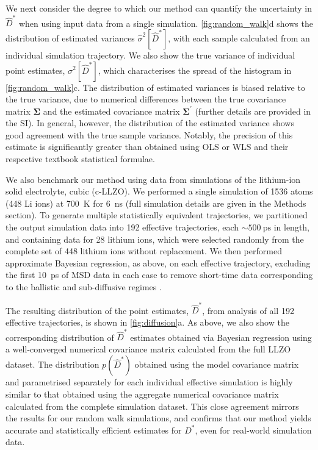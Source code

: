\documentclass[reprint,superscriptaddress,nobibnotes,amsmath,amssymb,aps,prx,hidelinks]{revtex4-2}
\newcommand{\prob}[1]{\ensuremath{p(#1)}}
\newcommand{\Dest}{\ensuremath{\widehat{D}^*}}
\newcommand{\D}{\ensuremath{D^*}}
\newcommand{\var}[1]{\ensuremath{\sigma^2[#1]}}
\newcommand{\varest}[1]{\ensuremath{\widehat{\sigma}^2[#1]}}
\begin{document}
We next consider the degree to which our method can quantify the uncertainty in $\Dest$ when using input data from a single simulation.
\cref{fig:random_walk}d shows the distribution of estimated variances $\varest{\Dest}$, with each sample calculated from an individual simulation trajectory.
We also show the true variance of individual point estimates, $\var{\Dest}$, which characterises the spread of the histogram in \cref{fig:random_walk}c.
The distribution of estimated variances is biased relative to the true variance, due to numerical differences between the true covariance matrix $\mathbf{\Sigma}$ and the estimated covariance matrix $\mathbf{\Sigma^\prime}$ (further details are provided in the SI).
In general, however, the distribution of the estimated variance shows good agreement with the true sample variance.
Notably, the precision of this estimate is significantly greater than obtained using OLS or WLS and their respective textbook statistical formulae.

We also benchmark our method using data from simulations of the lithium-ion solid electrolyte, cubic  (c-LLZO).
We performed a single simulation of \num{1536} atoms (\num{448} Li ions) at \SI{700}{K} for \SI{6}{\nano\second} (full simulation details are given in the Methods section).
To generate multiple statistically equivalent trajectories, we partitioned the output simulation data into \num{192} effective trajectories, each $\sim\SI{500}{\ps}$ in length, and containing data for \num{28} lithium ions, which were selected randomly from the complete set of \num{448} lithium ions without replacement.
We then performed approximate Bayesian regression, as above, on each effective trajectory, excluding the first \SI{10}{ps} of MSD data in each case to remove short-time data corresponding to the ballistic and sub-diffusive regimes \cite{burbano_sparse_2016,he_statistical_2018}.

The resulting distribution of the point estimates, $\Dest$, from analysis of all \num{192} effective trajectories, is shown in \cref{fig:diffusion}a.
As above, we also show the corresponding distribution of $\Dest$ estimates obtained via Bayesian regression using a well-converged numerical covariance matrix calculated from the full LLZO dataset.
The distribution $\prob{\Dest}$ obtained using the model covariance matrix and parametrised separately for each individual effective simulation is highly similar to that obtained using the aggregate numerical covariance matrix calculated from the complete simulation dataset.
This close agreement mirrors the results for our random walk simulations, and confirms that our method yields accurate and statistically efficient estimates for $\D$, even for real-world simulation data.
\end{document}
